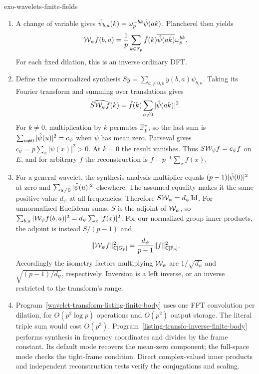 \begin{correction}{exo-wavelets-finite-fields}
\begin{enumerate}
\item A change of variable gives
$\hat{\psi}_{b,a}(k)=\omega_p^{-bk}\hat{\psi}(ak)$. Plancherel then yields
\[
 \mathcal{W}_\psi f(b,a)=\frac1p\sum_{k\in\mathbb{F}_p}
              \hat{f}(k)\overline{\hat{\psi}(ak)}\omega_p^{bk}.
\]
For each fixed dilation, this is an inverse ordinary DFT.
\item Define the unnormalized synthesis
$Sy=\sum_{a\ne0,b}y(b,a)\psi_{b,a}$. Taking its Fourier transform and
summing over translations gives
\[
 \widehat{S\mathcal{W}_\psi f}(k)=\hat{f}(k)\sum_{a\ne0}|\hat{\psi}(ak)|^2.
\]
For $k\ne0$, multiplication by $k$ permutes $\mathbb{F}_p^*$, so the last
sum is $\sum_{u\ne0}|\hat{\psi}(u)|^2=c_\psi$ when $\psi$ has mean zero.
Parseval gives $c_\psi=p\sum_x|\psi(x)|^2>0$. At $k=0$ the result
vanishes. Thus $S\mathcal{W}_\psi f=c_\psi f$ on $E$, and for arbitrary $f$
the reconstruction is $f-p^{-1}\sum_xf(x)$.
\item For a general wavelet, the synthesis-analysis multiplier equals
$(p-1)|\hat{\psi}(0)|^2$ at zero and $\sum_{u\ne0}|\hat{\psi}(u)|^2$ elsewhere.
The assumed equality makes it the same positive value $d_\psi$ at all
frequencies. Therefore $S\mathcal{W}_\psi=d_\psi\operatorname{Id}$.
For unnormalized Euclidean sums, $S$ is the adjoint of $\mathcal{W}_\psi$, so
$\sum_{b,a}|\mathcal{W}_\psi f(b,a)|^2=d_\psi\sum_x|f(x)|^2$.
For our normalized group inner products, the adjoint is instead
$S/(p-1)$ and
\[
 \lVert\mathcal{W}_\psi f\rVert_{\mathbb{C}[G_p]}^2
     =\frac{d_\psi}{p-1}\lVert f\rVert_{\mathbb{C}[\mathbb{F}_p]}^2.
\]
Accordingly the isometry factors multiplying $\mathcal{W}_\psi$ are
$1/\sqrt{d_\psi}$ and $\sqrt{(p-1)/d_\psi}$, respectively. Inversion
is a left inverse, or an inverse restricted to the transform's range.
\item Program~\ref{wavelet-transform-listing-finite-body} uses one
FFT convolution per dilation, for $O(p^2\log p)$ operations and
$O(p^2)$ output storage. The literal triple sum would cost $O(p^3)$.
Program~\ref{listing-transfo-inverse-finite-body} performs synthesis in
frequency coordinates and divides by the frame constant. Its default
mode recovers the mean-zero component; the full-space mode checks the
tight-frame condition. Direct complex-valued inner products and independent
reconstruction tests verify the conjugations and scaling.
\begin{listing}[H]
\caption{Affine-group wavelet analysis by ordinary FFTs.}
\label{wavelet-transform-listing-finite-body}
\end{listing}
\begin{listing}[H]
\caption{Wavelet reconstruction with explicit mean-zero and full-space conventions.}
\label{listing-transfo-inverse-finite-body}
\end{listing}
\end{enumerate}
\end{correction}
